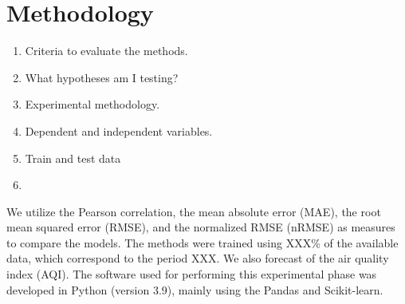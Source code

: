 \section{Methodology}
\label{sec:methodology}

\begin{enumerate}
    \item Criteria to evaluate the methods.
    \item What hypotheses am I testing?
    \item Experimental methodology.
    \item Dependent and independent variables. 
    \item Train and test data 
    \item {}
\end{enumerate}

We utilize the Pearson correlation, the mean absolute error (MAE), the root
mean squared error (RMSE), and the normalized RMSE (nRMSE) as measures to
compare the models. The methods were trained using XXX\% of the available data,
which correspond to the period XXX. We also forecast of the air quality index
(AQI). The software used for performing this experimental phase was developed
in Python (version 3.9), mainly using the Pandas and Scikit-learn.

